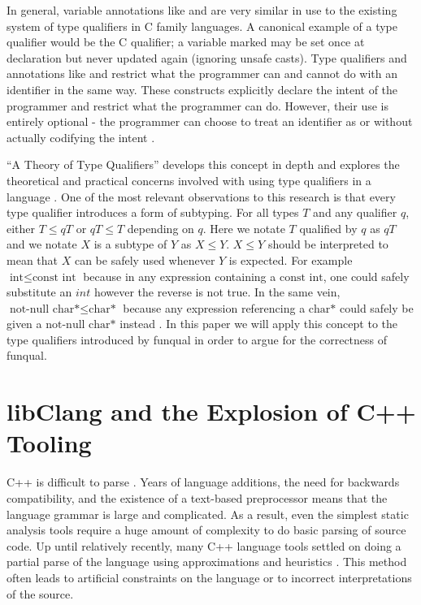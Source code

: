 In general, variable annotations like  and  are very similar in use to the existing system of type qualifiers in C family languages.  A canonical example of a type qualifier would be the C  qualifier; a variable marked  may be set once at declaration but never updated again (ignoring unsafe casts).  Type qualifiers and annotations like  and  restrict what the programmer can and cannot do with an identifier in the same way.  These constructs explicitly declare the intent of the programmer and restrict what the programmer can do.  However, their use is entirely optional - the programmer can choose to treat an identifier as  or  without actually codifying the intent \cite{theory-of-qual}.

``A Theory of Type Qualifiers'' develops this concept in depth and explores the theoretical and practical concerns involved with using type qualifiers in a language \cite{theory-of-qual}.  One of the most relevant observations to this research is that every type qualifier introduces a form of subtyping.  For all types $T$ and any qualifier $q$, either $T \leq q T$ or $q T \leq T$ depending on $q$.  Here we notate $T$ qualified by $q$ as $q T$ and we notate $X$ is a subtype of $Y$ as $X \leq Y$.  $X \leq Y$ should be interpreted to mean that $X$ can be safely used whenever $Y$ is expected.  For example $\textrm{int} \leq \textrm{const int}$ because in any expression containing a $\textrm{const int}$, one could safely substitute an $int$ however the reverse is not true.  In the same vein, $\textrm{not-null char*} \leq \textrm{char*}$ because any expression referencing a $\textrm{char*}$ could safely be given a $\textrm{not-null char*}$ instead \cite{theory-of-qual}.  In this paper we will apply this concept to the type qualifiers introduced by funqual in order to argue for the correctness of funqual.  

\section{libClang and the Explosion of C++ Tooling}\label{sec:related:libclang}

C++ is difficult to parse \cite{cpp-sucks, libclang-survey, mozilla-pork, parse-cpp}.  Years of language additions, the need for backwards compatibility, and the existence of a text-based preprocessor means that the language grammar is large and complicated.  As a result, even the simplest static analysis tools require a huge amount of complexity to do basic parsing of source code.  Up until relatively recently, many C++ language tools settled on doing a partial parse of the language using approximations and heuristics \cite{libclang-survey}.  This method often leads to artificial constraints on the language or to incorrect interpretations of the source.  


